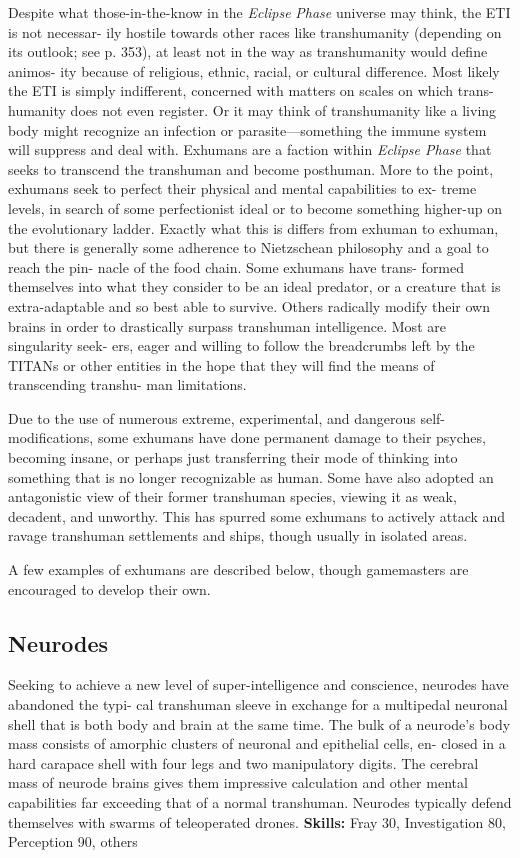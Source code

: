 Despite what those-in-the-know in the \textit{Eclipse }
\textit{Phase} universe may think, the ETI is not necessar-
ily hostile towards other races like transhumanity 
(depending on its outlook; see p. 353), at least not 
in the way as transhumanity would define animos-
ity because of religious, ethnic, racial, or cultural 
difference. Most likely the ETI is simply indifferent, 
concerned with matters on scales on which trans-
humanity does not even register. Or it may think of 
transhumanity like a living body might recognize an 
infection or parasite—something the immune system 
will suppress and deal with.
Exhumans are a faction within \textit{Eclipse Phase} that 
seeks to transcend the transhuman and become 
posthuman. More to the point, exhumans seek to 
perfect their physical and mental capabilities to ex-
treme levels, in search of some perfectionist ideal or 
to become something higher-up on the evolutionary 
ladder. Exactly what this is differs from exhuman to 
exhuman, but there is generally some adherence to 
Nietzschean philosophy and a goal to reach the pin-
nacle of the food chain. Some exhumans have trans-
formed themselves into what they consider to be an 
ideal predator, or a creature that is extra-adaptable 
and so best able to survive. Others radically modify 
their own brains in order to drastically surpass 
transhuman intelligence. Most are singularity seek-
ers, eager and willing to follow the breadcrumbs 
left by the TITANs or other entities in the hope that 
they will find the means of transcending transhu-
man limitations. 

Due to the use of numerous extreme, experimental, 
and dangerous self-modifications, some exhumans 
have done permanent damage to their psyches, 
becoming insane, or perhaps just transferring their 
mode of thinking into something that is no longer 
recognizable as human. Some have also adopted an 
antagonistic view of their former transhuman species, 
viewing it as weak, decadent, and unworthy. This 
has spurred some exhumans to actively attack and 
ravage transhuman settlements and ships, though 
usually in isolated areas.

A few examples of exhumans are described below, 
though gamemasters are encouraged to develop 
their own.

\subsection{Neurodes}

Seeking to achieve a new level of super-intelligence 
and conscience, neurodes have abandoned the typi-
cal transhuman sleeve in exchange for a multipedal 
neuronal shell that is both body and brain at the same 
time. The bulk of a neurode's body mass consists of 
amorphic clusters of neuronal and epithelial cells, en-
closed in a hard carapace shell with four legs and two 
manipulatory digits. The cerebral mass of neurode 
brains gives them impressive calculation and other 
mental capabilities far exceeding that of a normal 
transhuman. Neurodes typically defend themselves 
with swarms of teleoperated drones.
\textbf{Skills:} Fray 30, Investigation 80, Perception 90, others 

